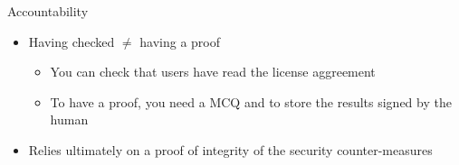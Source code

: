 \begin{reveals}
\begin{frame}
  \vfill

  \begin{block}{Accountability}
    \begin{itemize}
    \item Having checked \(\neq\) having a proof
      \begin{itemize}
      \item You can check that users have read the license aggreement
      \item To have a proof, you need a MCQ and to store the results
        signed by the human
      \end{itemize}
    \item Relies ultimately on a proof of integrity of the security counter-measures
    \end{itemize}
  \end{block}

  \vfill

\end{frame}



\end{reveals}


